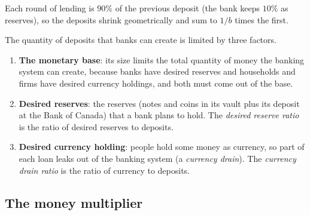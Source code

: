\begin{center}
\end{center}
Each round of lending is $90\%$ of the previous deposit (the bank keeps $10\%$ as
reserves), so the deposits shrink geometrically and sum to $1/b$ times the first.

The quantity of deposits that banks can create is limited by three factors.
\begin{enumerate}
  \item \textbf{The monetary base}: its size limits the total quantity of money the
        banking system can create, because banks have desired reserves and households and
        firms have desired currency holdings, and both must come out of the base.
  \item \textbf{Desired reserves}: the reserves (notes and coins in its vault plus its
        deposit at the Bank of Canada) that a bank plans to hold. The \emph{desired
        reserve ratio} is the ratio of desired reserves to deposits.
  \item \textbf{Desired currency holding}: people hold some money as currency, so part of
        each loan leaks out of the banking system (a \emph{currency drain}). The
        \emph{currency drain ratio} is the ratio of currency to deposits.
\end{enumerate}

\subsection{The money multiplier}

